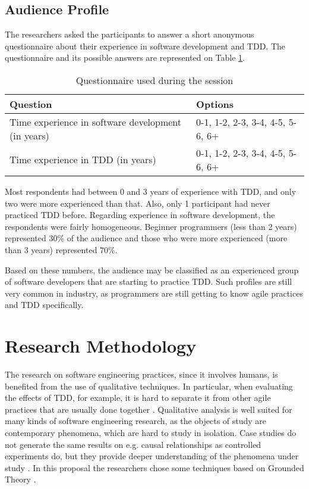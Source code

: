 \subsection{Audience Profile}
\label{sec:participants}

The researchers asked the participants to answer a short anonymous questionnaire
about their experience in software development and TDD. 
The questionnaire and its possible
answers are represented on Table \ref{questionnaire}.

\begin{center}
\begin{table}[h]
\centering
\begin{tabular}{ | p{5.5cm} || p{5.5cm} | }
\hline
Question & Options
\\ \hline \hline
Time experience in software development (in years) &
0-1, 1-2, 2-3, 3-4, 4-5, 5-6, 6+\hspace{0.1cm}
\\ \hline
Time experience in TDD (in years) &
0-1, 1-2, 2-3, 3-4, 4-5, 5-6, 6+
\\ \hline
\end{tabular}
\caption{Questionnaire used during the session}
\label{questionnaire}
\end{table}
\end{center}

Most respondents had between 0 and 3 years of experience with TDD, and only two
were more experienced than that. Also, only 1 participant had never practiced
TDD before. 
Regarding experience in software development, the respondents were fairly
homogeneous. Beginner programmers (less than 2 years) represented 30\% of the
audience and those who were more experienced (more than 3 years) represented
70\%.

Based on these numbers, the audience may be classified as an experienced group
of software developers that are starting to practice TDD. Such profiles 
are still very common in industry, as programmers are still getting to know
agile practices and TDD specifically.

\section{Research Methodology}

The research on software engineering practices, since it involves humans, is
benefited from the use of qualitative techniques. In particular, when evaluating
the effects of TDD, for example, it is hard to separate it from other agile
practices that are usually done together \cite{agile-manifesto}
\cite{guidelines-qualitative}.
Qualitative analysis is well suited for many kinds of software engineering
research, as the objects of study are contemporary phenomena, which are hard to
study in isolation.
Case studies do not generate the same results on e.g. causal relationships as
controlled experiments do, but they provide deeper understanding of the
phenomena under study \cite{guidelines-qualitative}.
In this proposal the researchers chose some techniques based on Grounded
Theory \cite{grounded-theory}.

